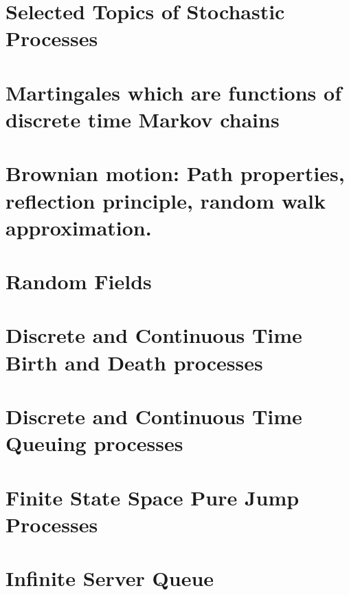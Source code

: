 \section{Selected Topics of Stochastic Processes}
\section{Martingales which are functions of discrete time Markov chains}
\section{Brownian motion: Path properties, reflection principle, random walk approximation.}
\section{Random Fields}
\section{Discrete and Continuous Time Birth and Death processes}
\section{Discrete and Continuous Time Queuing processes}
\section{Finite State Space Pure Jump Processes}
\section{Infinite Server Queue}
